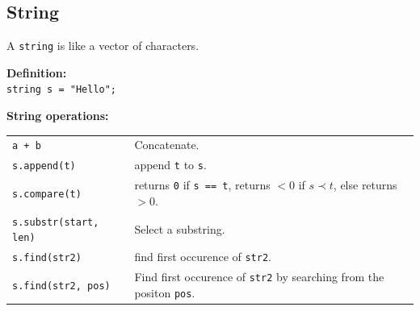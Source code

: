 \subsection{String}

A \texttt{string} is like a vector of characters.

\textbf{Definition:}\\
\texttt{string s = "Hello";}

\textbf{String operations:}\\
\begin{tabularx}{\linewidth}{lX}
\texttt{a + b} & Concatenate.\\
\texttt{s.append(t)} & append \texttt{t} to \texttt{s}.\\
\texttt{s.compare(t)} & returns \texttt{0} if \texttt{s == t}, returns $< 0$ if $s \prec t$, else returns $> 0$.\\
\texttt{s.substr(start, len)} & Select a substring. \\
\texttt{s.find(str2)} & find first occurence of \texttt{str2}. \\
\texttt{s.find(str2, pos)} & Find first occurence of \texttt{str2} by searching from the positon \texttt{pos}.
\end{tabularx}

